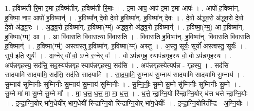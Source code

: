 \documentclass[17pt]{extarticle}
\begin{document}
1. ह॒विष्म॑ती रि॒मा इ॒मा ह॒विष्म॑तीर्. ह॒विष्म॑ती रि॒माः । . इ॒मा आप॒ आप॑ इ॒मा इ॒मा आपः॑ । . आपो॑ ह॒विष्मा॑न्. ह॒विष्मा॒ नाप॒ आपो॑ ह॒विष्मान्॑ । . ह॒विष्मा᳚न् दे॒वो दे॒वो ह॒विष्मा॑न्. ह॒विष्मा᳚न् दे॒वः । . दे॒वो अ॑द्ध्व॒रो अ॑द्ध्व॒रो दे॒वो दे॒वो अ॑द्ध्व॒रः । . अ॒द्ध्व॒रो ह॒विष्मा॑न्. ह॒विष्मा(ग्म्॑) अद्ध्व॒रो अ॑द्ध्व॒रो ह॒विष्मान्॑ । . ह॒विष्मा॒(ग्म्॒) आ ह॒विष्मा॑न्. ह॒विष्मा॒(ग्म्॒) आ । . आ वि॑वासति विवास॒त्या वि॑वासति । . वि॒वा॒स॒ति॒ ह॒विष्मा॑न्. ह॒विष्मा॑न्. विवासति विवासति ह॒विष्मान्॑ । . ह॒विष्मा(ग्म्॑) अस्त्वस्तु ह॒विष्मा॑न्. ह॒विष्मा(ग्म्॑) अस्तु । . अ॒स्तु॒ सूर्यः॒ सूर्यो॑ अस्त्वस्तु॒ सूर्यः॑ । . सुर्य॒ इति॒ सूर्यः॑ । . अ॒ग्नेर् वो॑ वो॒ ऽग्ने र॒ग्नेर् वः॑ । . वो ऽप॑न्नगृह॒ स्याप॑न्नगृहस्य वो॒ वो ऽप॑न्नगृहस्य । . अप॑न्नगृहस्य॒ सद॑सि॒ सद॒स्यप॑न्नगृह॒ स्याप॑न्नगृहस्य॒ सद॑सि । . अप॑न्नगृह॒स्येत्यप॑न्न - गृ॒ह॒स्य॒ । . सद॑सि सादयामि सादयामि॒ सद॑सि॒ सद॑सि सादयामि । . सा॒द॒या॒मि॒ सु॒म्नाय॑ सु॒म्नाय॑ सादयामि सादयामि सु॒म्नाय॑ । . सु॒म्नाय॑ सुम्निनीः सुम्निनीः सु॒म्नाय॑ सु॒म्नाय॑ सुम्निनीः । . सु॒म्नि॒नीः॒ सु॒म्ने सु॒म्ने सु॑म्निनीः सुम्निनीः सु॒म्ने । . सु॒म्ने मा॑ मा सु॒म्ने सु॒म्ने मा᳚ । . मा॒ ध॒त्त॒ ध॒त्त॒ मा॒ मा॒ ध॒त्त॒ । . ध॒त्ते॒ न्द्रा॒ग्नि॒यो रि॑न्द्राग्नि॒योर् ध॑त्त धत्ते न्द्राग्नि॒योः । . इ॒न्द्रा॒ग्नि॒योर् भा॑ग॒धेयी᳚र् भाग॒धेयी॑ रिन्द्राग्नि॒यो रि॑न्द्राग्नि॒योर् भा॑ग॒धेयीः᳚ । . इ॒न्द्रा॒ग्नि॒योरिती᳚न्द्र - अ॒ग्नि॒योः । \newline
\end{document}
